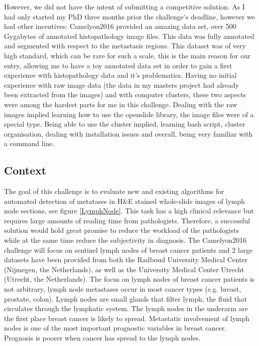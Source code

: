 \documentclass[a4paper,10pt]{article}
\begin{document}
However, we did not have the intent of submitting a competitive solution. As I had only started my PhD three months prior the challenge's deadline, however we had other incentives: Camelyon2016 provided an amazing data set, over 500 Gygabytes of annotated histopathology image files. This data was fully annotated and segmented with respect to the metastasis regions. This dataset was of very high standard, which can be rare for such a scale, this is the main reason for our entry, allowing me to have a toy annotated data set in order to gain a first experience with histopathology data and it's problematics. Having no initial experience with raw image data (the data in my masters project had already been extracted from the images) and with computer clusters, these two aspects were among the hardest parts for me in this challenge. Dealing with the raw images implied learning how to use the openslide library, the image files were of a special type. Being able to use the cluster implied, learning bash script, cluster organisation, dealing with installation issues and overall, being very familiar with a command line.

\subsection{Context}
The goal of this challenge is to evaluate new and existing algorithms for automated detection of metatases in H\&E stained whole-slide images of lymph node sections, see figure \ref{LymphNode}. This task has a high clinical relevance but requires large amounts of reading time from pathologists. Therefore, a successful solution would hold great promise to reduce the workload of the pathologists while at the same time reduce the subjectivity in diagnosis. The Camelyon2016 challenge will focus on sentinel lymph nodes of breast cancer patients and 2 large datasets have been provided from both the Radboud University Medical Center (Nijmegen, the Netherlands), as well as the University Medical Center Utrecht (Utrecht, the Netherlands). The focus on lymph nodes of breast cancer patients is not arbitrary, lymph node metastases occur in most cancer types (e.g. breast, prostate, colon). Lymph nodes are small glands that filter lymph, the fluid that circulates through the lymphatic system. The lymph nodes in the underarm are the first place breast cancer is likely to spread. Metastatic involvement of lymph nodes is one of the most important prognostic variables in breast cancer. Prognosis is poorer when cancer has spread to the lymph nodes.
\end{document}
